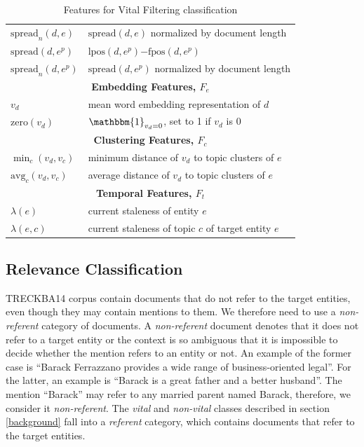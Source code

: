 \documentclass{article}
\begin{document}
\begin{table}[tb]
{\begin{tabular}{p{}p{}}
$\text{spread}_n(d,e)$ & $\text{spread}(d,e)$ normalized by document length \\
$\text{spread}(d,e^p)$ & $\text{lpos}(d,e^p)\mathord{-}\text{fpos}(d,e^p)$ \\
$\text{spread}_n(d,e^p)$ & $\text{spread}(d,e^p)$ normalized by document length \\ 
\midrule
\multicolumn{2}{c}{\textbf{Embedding Features, $F_e$}} \\ %
\midrule
  $v_d$ & mean word embedding representation of $d$ \\
  $\text{zero}(v_d)$& $\mathbbm{1}_{v_d=0}$, set to 1 if $v_d$ is $0$ \\
\midrule
\multicolumn{2}{c}{\textbf{Clustering Features, $F_c$}} \\ %
\midrule
  $\min_c(v_d,v_c)$& minimum distance of $v_d$ to topic clusters of $e$ \\
  $\text{avg}_c(v_d,v_c)$& average distance of $v_d$ to topic clusters of $e$ \\
\midrule
\multicolumn{2}{c}{\textbf{Temporal Features, $F_t$}} \\ %
\midrule
  $\lambda(e)$& current staleness of entity $e$ \\
  $\lambda(e,c)$& current staleness of topic $c$ of target entity $e$ \\
\bottomrule
\end{tabular}
} %
\caption{Features for Vital Filtering classification}
\label{features}
\end{table}


\subsection{Relevance Classification}

TRECKBA14 corpus contain documents that do not refer to the target entities, even though they may contain mentions to them. We therefore need to use a \emph{non-referent} category of documents. 
%
A \emph{non-referent} document denotes that it does not refer to a target entity or the context is so ambiguous that it is impossible to decide whether the mention refers to an entity or not. An example of the former case is ``Barack Ferrazzano provides a wide range of business-oriented legal''. For the latter, an example is ``Barack is a great father and a better husband''. The mention ``Barack'' may refer to any married parent named Barack, therefore, we consider it \emph{non-referent}.
%
The \emph{vital} and \emph{non-vital} classes described in section \ref{background} fall into a \emph{referent} category, which contains documents that refer to the target entities.
\end{document}
